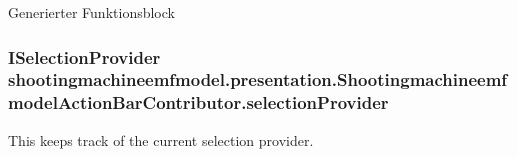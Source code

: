 Generierter Funktionsblock \hypertarget{classshootingmachineemfmodel_1_1presentation_1_1_shootingmachineemfmodel_action_bar_contributor_a0c7245bf969af3a5de0873e558a6c9dd}{
\subsubsection[{selection\-Provider}]{\setlength{\rightskip}{0pt plus 5cm}I\-Selection\-Provider shootingmachineemfmodel.\-presentation.\-Shootingmachineemfmodel\-Action\-Bar\-Contributor.\-selection\-Provider\hspace{0.3cm}{\ttfamily [protected]}}}\label{classshootingmachineemfmodel_1_1presentation_1_1_shootingmachineemfmodel_action_bar_contributor_a0c7245bf969af3a5de0873e558a6c9dd}
This keeps track of the current selection provider.

